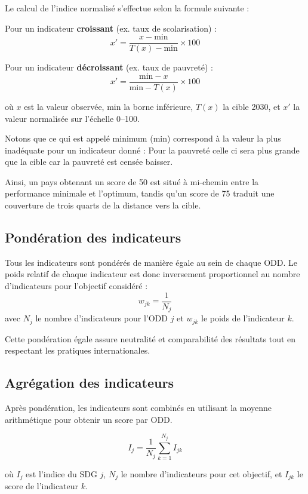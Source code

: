 \begin{remark}
Le calcul de l’indice normalisé s’effectue selon la formule suivante :
\end{remark}

\begin{simplebox2}
Pour un indicateur \textbf{croissant} (ex. taux de scolarisation) :
\[
x' = \frac{x - \text{min}}{T(x) - \text{min}} \times 100
\]

Pour un indicateur \textbf{décroissant} (ex. taux de pauvreté) :
\[
x' = \frac{\text{min} - x}{\text{min} - T(x)} \times 100
\]

où $x$ est la valeur observée, $\text{min}$ la borne inférieure, $T(x)$ la cible 2030, et $x'$ la valeur normalisée sur l’échelle 0--100.

\begin{remark}
Notons que ce qui est appelé minimum (min) correspond à la valeur la plus inadéquate pour un indicateur donné : Pour la pauvreté celle ci sera plus grande que la cible car la pauvreté est censée baisser.
\end{remark}

\end{simplebox2}

Ainsi, un pays obtenant un score de 50 est situé à mi-chemin entre la performance minimale et l’optimum, tandis qu’un score de 75 traduit une couverture de trois quarts de la distance vers la cible.


\subsection{Pondération des indicateurs}

Tous les indicateurs sont pondérés de manière égale au sein de chaque ODD. Le poids relatif de chaque indicateur est donc inversement proportionnel au nombre d’indicateurs pour l’objectif considéré :
\[
w_{jk} = \frac{1}{N_j}
\]
avec $N_j$ le nombre d’indicateurs pour l’ODD $j$ et $w_{jk}$ le poids de l’indicateur $k$.

Cette pondération égale assure neutralité et comparabilité des résultats tout en respectant les pratiques internationales.

\subsection{Agrégation des indicateurs}

Après pondération, les indicateurs sont combinés en utilisant la moyenne arithmétique pour obtenir un score par ODD.

\[
I_j = \frac{1}{N_j} \sum_{k=1}^{N_j} I_{jk}
\]

où $I_j$ est l’indice du SDG $j$, $N_j$ le nombre d’indicateurs pour cet objectif, et $I_{jk}$ le score de l’indicateur $k$.
